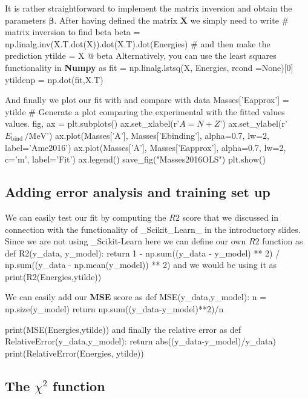 \documentclass[%
oneside,                 %
final,                   %
10pt]{article}
\begin{document}
It is rather straightforward to implement the matrix inversion and obtain the parameters $\bm{\beta}$. After having defined the matrix $\bm{X}$ we simply need to 
write
\bpycod
# matrix inversion to find beta
beta = np.linalg.inv(X.T.dot(X)).dot(X.T).dot(Energies)
# and then make the prediction
ytilde = X @ beta
\epycod
Alternatively, you can use the least squares functionality in \textbf{Numpy} as
\bpycod
fit = np.linalg.lstsq(X, Energies, rcond =None)[0]
ytildenp = np.dot(fit,X.T)
\epycod

And finally we plot our fit with and compare with data
\bpycod
Masses['Eapprox']  = ytilde
# Generate a plot comparing the experimental with the fitted values values.
fig, ax = plt.subplots()
ax.set_xlabel(r'$A = N + Z$')
ax.set_ylabel(r'$E_\mathrm{bind}\,/\mathrm{MeV}$')
ax.plot(Masses['A'], Masses['Ebinding'], alpha=0.7, lw=2,
            label='Ame2016')
ax.plot(Masses['A'], Masses['Eapprox'], alpha=0.7, lw=2, c='m',
            label='Fit')
ax.legend()
save_fig("Masses2016OLS")
plt.show()
\epycod

\subsection{Adding error analysis and training set up}

We can easily test our fit by computing the $R2$ score that we discussed in connection with the functionality of _Scikit_Learn_ in the introductory slides.
Since we are not using _Scikit-Learn here we can define our own $R2$ function as
\bpycod
def R2(y_data, y_model):
    return 1 - np.sum((y_data - y_model) ** 2) / np.sum((y_data - np.mean(y_model)) ** 2)
\epycod
and we would be using it as 
\bpycod
print(R2(Energies,ytilde))
\epycod

We can easily add our \textbf{MSE} score as
\bpycod
def MSE(y_data,y_model):
    n = np.size(y_model)
    return np.sum((y_data-y_model)**2)/n

print(MSE(Energies,ytilde))
\epycod
and finally the relative error as
\bpycod
def RelativeError(y_data,y_model):
    return abs((y_data-y_model)/y_data)
print(RelativeError(Energies, ytilde))
\epycod





\subsection{The $\chi^2$ function}

\end{document}
